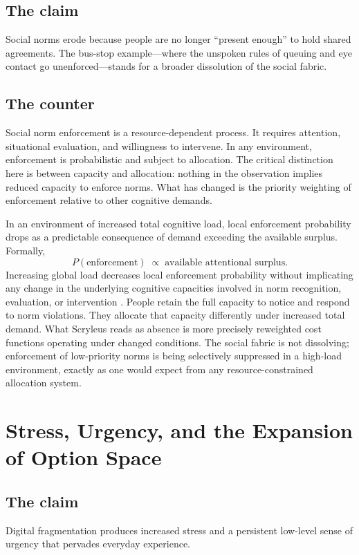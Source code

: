\documentclass[12pt, a4paper]{article}
\begin{document}
\subsection{The claim}
Social norms erode because people are no longer ``present enough'' to hold shared agreements. The bus-stop example---where the unspoken rules of queuing and eye contact go unenforced---stands for a broader dissolution of the social fabric.

\subsection{The counter}
Social norm enforcement is a resource-dependent process. It requires attention, situational evaluation, and willingness to intervene. In any environment, enforcement is probabilistic and subject to allocation. The critical distinction here is between capacity and allocation: nothing in the observation implies reduced capacity to enforce norms. What has changed is the priority weighting of enforcement relative to other cognitive demands.

In an environment of increased total cognitive load, local enforcement probability drops as a predictable consequence of demand exceeding the available surplus. Formally,
\[
P(\text{enforcement}) \;\propto\; \text{available attentional surplus}.
\]
Increasing global load decreases local enforcement probability without implicating any change in the underlying cognitive capacities involved in norm recognition, evaluation, or intervention \cite{Ashby1956}. People retain the full capacity to notice and respond to norm violations. They allocate that capacity differently under increased total demand. What Scryleus reads as absence is more precisely reweighted cost functions operating under changed conditions. The social fabric is not dissolving; enforcement of low-priority norms is being selectively suppressed in a high-load environment, exactly as one would expect from any resource-constrained allocation system.

\section{Stress, Urgency, and the Expansion of Option Space}

\subsection{The claim}
Digital fragmentation produces increased stress and a persistent low-level sense of urgency that pervades everyday experience.
\end{document}
